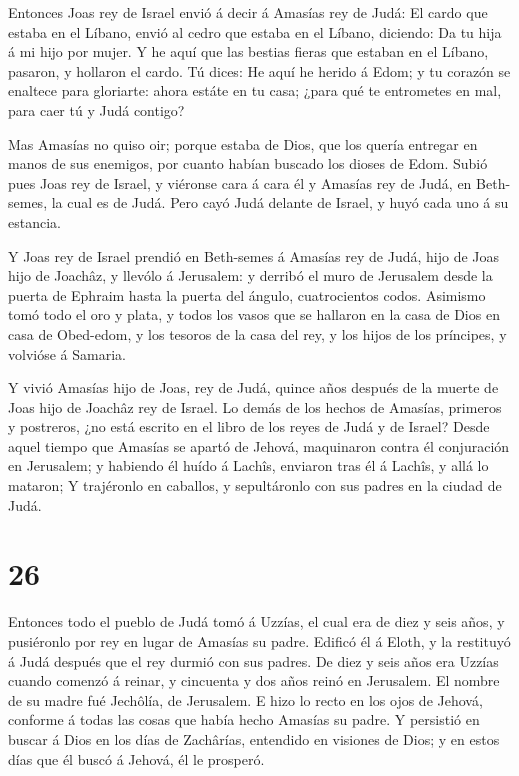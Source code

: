  Entonces Joas rey de Israel envió á decir á Amasías rey de
Judá: El cardo que estaba en el Líbano, envió al cedro que estaba en el
Líbano, diciendo: Da tu hija á mi hijo por mujer. Y he aquí que las
bestias fieras que estaban en el Líbano, pasaron, y hollaron el cardo.
 Tú dices: He aquí he herido á Edom; y tu corazón se
enaltece para gloriarte: ahora estáte en tu casa; ¿para qué te
entrometes en mal, para caer tú y Judá contigo?

 Mas Amasías no quiso oir; porque estaba de Dios, que los
quería entregar en manos de sus enemigos, por cuanto habían buscado los
dioses de Edom.  Subió pues Joas rey de Israel, y viéronse
cara á cara él y Amasías rey de Judá, en Beth-semes, la cual es de Judá.
 Pero cayó Judá delante de Israel, y huyó cada uno á su
estancia.

 Y Joas rey de Israel prendió en Beth-semes á Amasías rey
de Judá, hijo de Joas hijo de Joachâz, y llevólo á Jerusalem: y derribó
el muro de Jerusalem desde la puerta de Ephraim hasta la puerta del
ángulo, cuatrocientos codos.  Asimismo tomó todo el oro y
plata, y todos los vasos que se hallaron en la casa de Dios en casa de
Obed-edom, y los tesoros de la casa del rey, y los hijos de los
príncipes, y volvióse á Samaria.

 Y vivió Amasías hijo de Joas, rey de Judá, quince años
después de la muerte de Joas hijo de Joachâz rey de Israel.
 Lo demás de los hechos de Amasías, primeros y postreros,
¿no está escrito en el libro de los reyes de Judá y de Israel?
 Desde aquel tiempo que Amasías se apartó de Jehová,
maquinaron contra él conjuración en Jerusalem; y habiendo él huído á
Lachîs, enviaron tras él á Lachîs, y allá lo mataron;  Y
trajéronlo en caballos, y sepultáronlo con sus padres en la ciudad de
Judá.

\hypertarget{section-25}{%
\section{26}\label{section-25}}

 Entonces todo el pueblo de Judá tomó á Uzzías, el cual era
de diez y seis años, y pusiéronlo por rey en lugar de Amasías su padre.
 Edificó él á Eloth, y la restituyó á Judá después que el
rey durmió con sus padres.  De diez y seis años era Uzzías
cuando comenzó á reinar, y cincuenta y dos años reinó en Jerusalem. El
nombre de su madre fué Jechôlía, de Jerusalem.  E hizo lo
recto en los ojos de Jehová, conforme á todas las cosas que había hecho
Amasías su padre.  Y persistió en buscar á Dios en los días
de Zachârías, entendido en visiones de Dios; y en estos días que él
buscó á Jehová, él le prosperó.

